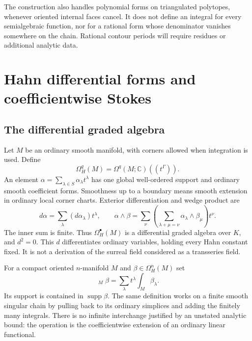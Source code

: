 \documentclass[11pt,letterpaper]{article}
\theoremstyle{definition}
\theoremstyle{remark}
\newcommand{\C}{\mathbb C}\newcommand{\R}{\mathbb R}\newcommand{\Q}{\mathbb Q}\newcommand{\Z}{\mathbb Z}\newcommand{\N}{\mathbb N}
\newcommand{\supp}{\operatorname{supp}}\newcommand{\red}{\operatorname{red}}\newcommand{\st}{\operatorname{st}}
\newcommand{\HInt}{\mathop{\int^{\!H}}\nolimits}\newcommand{\HCoint}{\mathop{\oint^{\!H}}\nolimits}
\numberwithin{equation}{section}
\begin{document}
The construction also handles polynomial forms on triangulated polytopes, whenever oriented internal faces cancel. It does not define an integral for every semialgebraic function, nor for a rational form whose denominator vanishes somewhere on the chain. Rational contour periods will require residues or additional analytic data.

\section{Hahn differential forms and coefficientwise Stokes}\label{sec:derham}
\subsection{The differential graded algebra}
Let $M$ be an ordinary smooth manifold, with corners allowed when integration is used. Define
\begin{equation}\label{eq:hahnforms}
 \Omega_H^q(M)=\Omega^q(M;\C)((t^\Gamma)).
\end{equation}
An element $\alpha=\sum_{\lambda\in S}\alpha_\lambda t^\lambda$ has one global well-ordered support and ordinary smooth coefficient forms. Smoothness up to a boundary means smooth extension in ordinary local corner charts. Exterior differentiation and wedge product are
\[
 d\alpha=\sum_\lambda(d\alpha_\lambda)t^\lambda,
 \qquad
 \alpha\wedge\beta=\sum_\nu\left(\sum_{\lambda+\mu=\nu}
          \alpha_\lambda\wedge\beta_\mu\right)t^\nu.
\]
The inner sum is finite. Thus $\Omega_H^\bullet(M)$ is a differential graded algebra over $K$, and $d^2=0$. This $d$ differentiates ordinary variables, holding every Hahn constant fixed. It is not a derivation of the surreal field considered as a transseries field.

For a compact oriented $n$-manifold $M$ and $\beta\in\Omega_H^n(M)$ set
\begin{equation}\label{eq:hintforms}
 \HInt_M\beta=\sum_\lambda t^\lambda\int_M\beta_\lambda.
\end{equation}
Its support is contained in $\supp\beta$. The same definition works on a finite smooth singular chain by pulling back to its ordinary simplices and adding the finitely many integrals. There is no infinite interchange justified by an unstated analytic bound: the operation is the coefficientwise extension of an ordinary linear functional.
\end{document}
